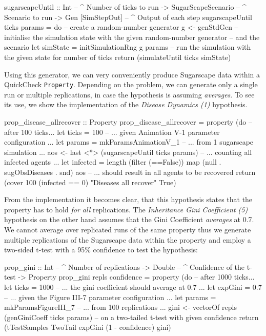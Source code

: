 \begin{HaskellCode}
sugarscapeUntil :: Int                -- ^ Number of ticks to run
                -> SugarScapeScenario -- ^ Scenario to run
                -> Gen [SimStepOut]   -- ^ Output of each step
sugarscapeUntil ticks params = do
  -- create a random-number generator
  g <- genStdGen
  -- initialise the simulation state with the given random-number generator
  -- and the scenario
  let simState = initSimulationRng g params
  -- run the simulation with the given state for number of ticks
  return (simulateUntil ticks simState)
\end{HaskellCode}

Using this generator, we can very conveniently produce Sugarscape data within a QuickCheck \texttt{Property}. Depending on the problem, we can generate only a single run or multiple replications, in case the hypothesis is assuming \textit{averages}. To see its use, we show the implementation of the \textit{Disease Dynamics (1)} hypothesis.

\begin{HaskellCode}
prop_disease_allrecover :: Property
prop_disease_allrecover = property (do
  -- after 100 ticks...
  let ticks = 100
  -- ... given Animation V-1 parameter configuration ...
  let params = mkParamsAnimationV_1
  -- ... from 1 sugarscape simulation ...
  aos <- last <*> (sugarscapeUntil ticks params)
  -- ... counting all infected agents ...
  let infected = length (filter (==False)) map (null . sugObsDiseases . snd) aos
  -- ... should result in all agents to be recovered
  return (cover 100 (infected == 0) "Diseases all recover" True)
\end{HaskellCode}

From the implementation it becomes clear, that this hypothesis states that the property has to hold \textit{for all} replications. The \textit{Inheritance Gini Coefficient (5)} hypothesis on the other hand assumes that the Gini Coefficient \textit{averages} at 0.7. We cannot average over replicated runs of the same property thus we generate multiple replications of the Sugarscape data within the property and employ a two-sided t-test with a 95\% confidence to test the hypothesis:

\begin{HaskellCode}
prop_gini :: Int      -- ^ Number of replications
          -> Double   -- ^ Confidence of the t-test
          -> Property
prop_gini repls confidence = property (do
  -- after 1000 ticks...
  let ticks = 1000
  -- ... the gini coefficient should average at 0.7 ...
  let expGini = 0.7
  -- ... given the Figure III-7 parameter configuration ...
  let params = mkParamsFigureIII_7
  -- ... from 100 replications ... 
  gini <- vectorOf repls (genGiniCoeff ticks params)
  -- on a two-tailed t-test with given confidence
  return (tTestSamples TwoTail expGini (1 - confidence) gini)
\end{HaskellCode}

